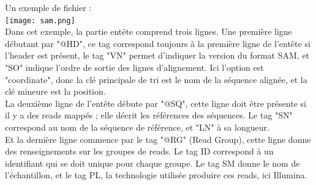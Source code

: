 \documentclass[a4paper,12pt]{article}
\begin{document}
Un exemple de fichier : \\
 \texttt{[image: sam.png]}~\\
Dans cet exemple, la partie entête comprend trois lignes. Une première ligne débutant par "@HD", ce tag correspond toujours à la première ligne de l'entête si l'header est présent, le tag "VN" permet d'indiquer la version du format SAM, et "SO" indique l'ordre de sortie des lignes d'alignement. Ici l'option est "coordinate", donc la clé principale de tri est le nom de la séquence alignée, et la clé mineure est la position. \\
La deuxième ligne de l'entête débute par "@SQ", cette ligne doit être présente si il y a des reads mappés ; elle décrit les références des séquences. Le tag "SN" correspond au nom de la séquence de référence, et "LN" à sa longueur. \\
Et la dernière ligne commence par le tag "@RG" (Read Group), cette ligne donne des renseignements sur les groupes de reads. Le tag ID correspond à un identifiant qui se doit unique pour chaque groupe. Le tag SM donne le nom de l'échantillon, et le tag PL, la technologie utilisée produire ces reads, ici Illumina. \\
\end{document}
